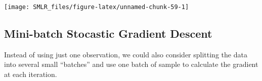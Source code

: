 \documentclass[
]{book}
\newenvironment{Shaded}{\begin{snugshade}}{\end{snugshade}}
\newcommand{\AttributeTok}[1]{\textcolor[rgb]{0.13,0.29,0.53}{#1}}
\newcommand{\CommentTok}[1]{\textcolor[rgb]{0.56,0.35,0.01}{\textit{#1}}}
\newcommand{\DecValTok}[1]{\textcolor[rgb]{0.00,0.00,0.81}{#1}}
\newcommand{\FloatTok}[1]{\textcolor[rgb]{0.00,0.00,0.81}{#1}}
\newcommand{\FunctionTok}[1]{\textcolor[rgb]{0.13,0.29,0.53}{\textbf{#1}}}
\newcommand{\NormalTok}[1]{#1}
\newcommand{\OtherTok}[1]{\textcolor[rgb]{0.56,0.35,0.01}{#1}}
\newcommand{\SpecialCharTok}[1]{\textcolor[rgb]{0.81,0.36,0.00}{\textbf{#1}}}
\newcommand{\StringTok}[1]{\textcolor[rgb]{0.31,0.60,0.02}{#1}}
\theoremstyle{definition}
\theoremstyle{definition}
\theoremstyle{definition}
\theoremstyle{definition}
\theoremstyle{remark}
\begin{document}
\begin{Shaded}
\end{Shaded}

\begin{center}\texttt{[image: SMLR\_files/figure-latex/unnamed-chunk-59-1]} \end{center}

\hypertarget{mini-batch-stocastic-gradient-descent}{%
\subsection{Mini-batch Stocastic Gradient Descent}\label{mini-batch-stocastic-gradient-descent}}

Instead of using just one observation, we could also consider splitting the data into several small ``batches'' and use one batch of sample to calculate the gradient at each iteration.
\end{document}
